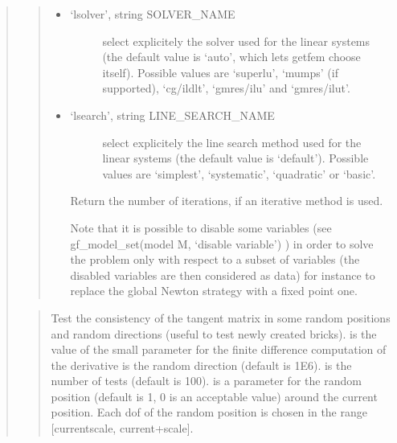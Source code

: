 \documentclass[a4paper,11pt,english]{sphinxmanual}
\begin{document}
\begin{quote}
\begin{quote}
\begin{itemize}
\item {} \begin{description}
\item[{‘lsolver’, string SOLVER\_NAME}] \leavevmode
select explicitely the solver used for the linear systems (the
default value is ‘auto’, which lets getfem choose itself).
Possible values are ‘superlu’, ‘mumps’ (if supported),
‘cg/ildlt’, ‘gmres/ilu’ and ‘gmres/ilut’.

\end{description}

\item {} \begin{description}
\item[{‘lsearch’, string LINE\_SEARCH\_NAME}] \leavevmode
select explicitely the line search method used for the linear systems (the
default value is ‘default’).
Possible values are ‘simplest’, ‘systematic’, ‘quadratic’ or ‘basic’.

\end{description}

Return the number of iterations, if an iterative method is used.

Note that it is possible to disable some variables
(see gf\_model\_set(model M, ‘disable variable’) ) in order to
solve the problem only with respect to a subset of variables (the
disabled variables are then considered as data) for instance to
replace the global Newton strategy with a fixed point one.

\end{itemize}
\end{quote}

\begin{quote}

Test the consistency of the tangent matrix in some random positions
and random directions (useful to test newly created bricks).
 is the value of the small parameter for the finite difference
computation of the derivative is the random direction (default is 1E\sphinxhyphen{}6).
 is the number of tests (default is 100).  is a parameter
for the random position (default is 1, 0 is an acceptable value) around
the current position.
Each dof of the random position is chosen in the range
{[}current\sphinxhyphen{}scale, current+scale{]}.
\end{quote}


\end{quote}
\end{document}
